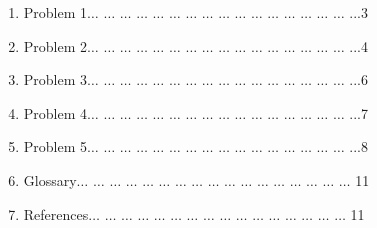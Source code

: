 \documentclass[12pt]{article}
\begin{document}
\begin{enumerate}
	\item Problem 1$ \ldots $ $ \ldots $ $ \ldots $ $ \ldots $ $ \ldots $ $ \ldots $ $ \ldots $ $ \ldots $ $ \ldots $ $ \ldots $ $ \ldots $ $ \ldots $ $ \ldots $ $ \ldots $ $ \ldots $ $ \ldots $ ...3\par

	\item Problem 2$ \ldots $ $ \ldots $ $ \ldots $ $ \ldots $ $ \ldots $ $ \ldots $ $ \ldots $ $ \ldots $ $ \ldots $ $ \ldots $ $ \ldots $ $ \ldots $ $ \ldots $ $ \ldots $ $ \ldots $ $ \ldots $ ...4\par

	\item Problem 3$ \ldots $ $ \ldots $ $ \ldots $ $ \ldots $ $ \ldots $ $ \ldots $ $ \ldots $ $ \ldots $ $ \ldots $ $ \ldots $ $ \ldots $ $ \ldots $ $ \ldots $ $ \ldots $ $ \ldots $ $ \ldots $ ...6\par

	\item Problem 4$ \ldots $ $ \ldots $ $ \ldots $ $ \ldots $ $ \ldots $ $ \ldots $ $ \ldots $ $ \ldots $ $ \ldots $ $ \ldots $ $ \ldots $ $ \ldots $ $ \ldots $ $ \ldots $ $ \ldots $ $ \ldots $ ...7\par

	\item Problem 5$ \ldots $ $ \ldots $ $ \ldots $ $ \ldots $ $ \ldots $ $ \ldots $ $ \ldots $ $ \ldots $ $ \ldots $ $ \ldots $ $ \ldots $ $ \ldots $ $ \ldots $ $ \ldots $ $ \ldots $ $ \ldots $ ...8\par

	\item Glossary$ \ldots $ $ \ldots $ $ \ldots $ $ \ldots $ $ \ldots $ $ \ldots $ $ \ldots $ $ \ldots $ $ \ldots $ $ \ldots $ $ \ldots $ $ \ldots $ $ \ldots $ $ \ldots $ $ \ldots $ $ \ldots $ $ \ldots $ 11\par

	\item References$ \ldots $ $ \ldots $ $ \ldots $ $ \ldots $ $ \ldots $ $ \ldots $ $ \ldots $ $ \ldots $ $ \ldots $ $ \ldots $ $ \ldots $ $ \ldots $ $ \ldots $ $ \ldots $ $ \ldots $ $ \ldots $ 11
\end{enumerate}\par


\vspace{\baselineskip}

\vspace{\baselineskip}

\vspace{\baselineskip}
\end{document}
